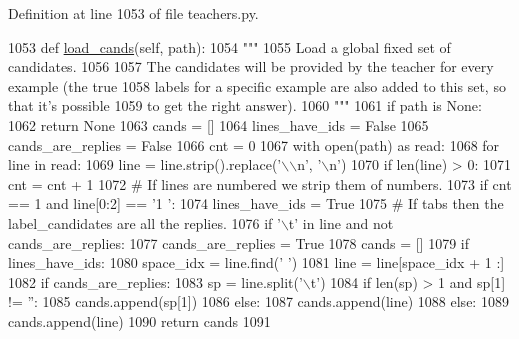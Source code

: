 Definition at line 1053 of file teachers.\+py.


\begin{DoxyCode}
1053     \textcolor{keyword}{def }\hyperlink{namespaceparlai_1_1utils_1_1misc_ad935ab0a9d49b897c5e3efdbe1c46c4d}{load\_cands}(self, path):
1054         \textcolor{stringliteral}{"""}
1055 \textcolor{stringliteral}{        Load a global fixed set of candidates.}
1056 \textcolor{stringliteral}{}
1057 \textcolor{stringliteral}{        The candidates will be provided by the teacher for every example (the true}
1058 \textcolor{stringliteral}{        labels for a specific example are also added to this set, so that it's possible}
1059 \textcolor{stringliteral}{        to get the right answer).}
1060 \textcolor{stringliteral}{        """}
1061         \textcolor{keywordflow}{if} path \textcolor{keywordflow}{is} \textcolor{keywordtype}{None}:
1062             \textcolor{keywordflow}{return} \textcolor{keywordtype}{None}
1063         cands = []
1064         lines\_have\_ids = \textcolor{keyword}{False}
1065         cands\_are\_replies = \textcolor{keyword}{False}
1066         cnt = 0
1067         with open(path) \textcolor{keyword}{as} read:
1068             \textcolor{keywordflow}{for} line \textcolor{keywordflow}{in} read:
1069                 line = line.strip().replace(\textcolor{stringliteral}{'\(\backslash\)\(\backslash\)n'}, \textcolor{stringliteral}{'\(\backslash\)n'})
1070                 \textcolor{keywordflow}{if} len(line) > 0:
1071                     cnt = cnt + 1
1072                     \textcolor{comment}{# If lines are numbered we strip them of numbers.}
1073                     \textcolor{keywordflow}{if} cnt == 1 \textcolor{keywordflow}{and} line[0:2] == \textcolor{stringliteral}{'1 '}:
1074                         lines\_have\_ids = \textcolor{keyword}{True}
1075                     \textcolor{comment}{# If tabs then the label\_candidates are all the replies.}
1076                     \textcolor{keywordflow}{if} \textcolor{stringliteral}{'\(\backslash\)t'} \textcolor{keywordflow}{in} line \textcolor{keywordflow}{and} \textcolor{keywordflow}{not} cands\_are\_replies:
1077                         cands\_are\_replies = \textcolor{keyword}{True}
1078                         cands = []
1079                     \textcolor{keywordflow}{if} lines\_have\_ids:
1080                         space\_idx = line.find(\textcolor{stringliteral}{' '})
1081                         line = line[space\_idx + 1 :]
1082                         \textcolor{keywordflow}{if} cands\_are\_replies:
1083                             sp = line.split(\textcolor{stringliteral}{'\(\backslash\)t'})
1084                             \textcolor{keywordflow}{if} len(sp) > 1 \textcolor{keywordflow}{and} sp[1] != \textcolor{stringliteral}{''}:
1085                                 cands.append(sp[1])
1086                         \textcolor{keywordflow}{else}:
1087                             cands.append(line)
1088                     \textcolor{keywordflow}{else}:
1089                         cands.append(line)
1090         \textcolor{keywordflow}{return} cands
1091 
\end{DoxyCode}
